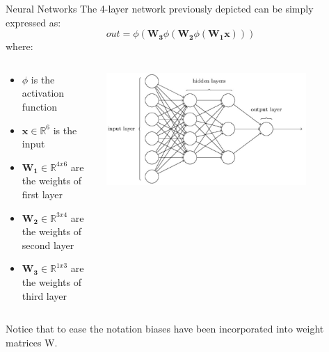 \documentclass[aspectratio=169]{beamer}
\newcommand{\R}{\mathbb{R}}
\begin{document}

\begin{frame}{Neural Networks}
The 4-layer network previously depicted can be simply expressed as:
\begin{equation}\label{eq:feedforward}
out = \phi(\mathbf{W_3}\phi(\mathbf{W_2}\phi(\mathbf{W_1x})))
\end{equation}
where:
\begin{columns}
\begin{column}{0.6\textwidth}
\begin{itemize}
\item $\phi$ is the activation function
\item $\mathbf{x} \in \R^{6}$ is the input 
\item $\mathbf{W_1} \in \R^{4x6}$ are the weights of first layer
\item $\mathbf{W_2} \in \R^{3x4}$ are the weights of second layer
\item $\mathbf{W_3} \in \R^{1x3}$ are the weights of third layer
\end{itemize}
\end{column}
\begin{column}{0.4\textwidth}
\includegraphics[width=0.8\textwidth]{img/dnn/neural_network.jpg}   
\end{column}
\end{columns}
\vspace{0.1cm}
\small{Notice that to ease the notation biases have been incorporated into weight matrices W.}
\end{frame}

\end{document}
